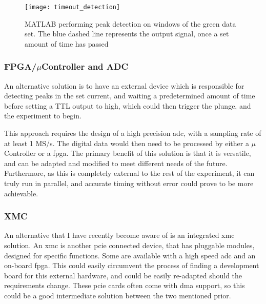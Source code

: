 \begin{figure}[htbp!]
	\centering
	\texttt{[image: timeout\_detection]}
	\caption{MATLAB performing peak detection on windows of the green data set. The blue dashed line represents the output signal, once a set amount of time has passed}
	\label{fig::timeout_detection}
\end{figure}

\subsubsection{FPGA/$\mu$Controller and ADC}
An alternative solution is to have an external device which is responsible for detecting peaks in the \gls{set} current, and waiting a predetermined amount of time before setting a TTL output to high, which could then trigger the plunge, and the experiment to begin.

This approach requires the design of a high precision \gls{adc}, with a sampling rate of at least 1 MS/s. The digital data would then need to be processed by either a $\mu$Controller or a \gls{fpga}. The primary benefit of this solution is that it is versatile, and can be adapted and modified to meet different needs of the future. Furthermore, as this is completely external to the rest of the experiment, it can truly run in parallel, and accurate timing without error could prove to be more achievable.
\subsubsection{XMC}
An alternative that I have recently become aware of is an integrated \gls{xmc} solution. An \gls{xmc} is another \gls{pcie} connected device, that has pluggable modules, designed for specific functions. Some are available with a high speed \gls{adc} and an on-board \gls{fpga}. This could easily circumvent the process of finding a development board for this external hardware, and could be easily re-adapted should the requirements change. These \gls{pcie} cards often come with \gls{dma} support, so this could be a good intermediate solution between the two mentioned prior.
